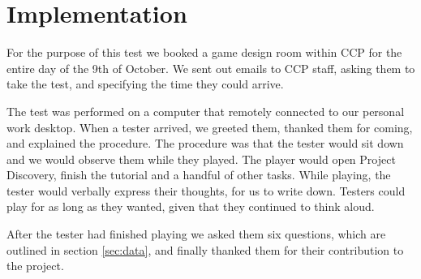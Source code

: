 \section{Implementation}\label{sec:implementation}
For the purpose of this test we booked a game design room within CCP for the entire day of the 9th of October. We sent out emails to CCP staff, asking them to take the test, and specifying the time they could arrive.

The test was performed on a computer that remotely connected to our personal work desktop. When a tester arrived, we greeted them, thanked them for coming, and explained the procedure. The procedure was that the tester would sit down and we would observe them while they played. The player would open Project Discovery, finish the tutorial and a handful of other tasks. While playing, the tester would verbally express their thoughts, for us to write down. Testers could play for as long as they wanted, given that they continued to think aloud.

After the tester had finished playing we asked them six questions, which are outlined in section \ref{sec:data}, and finally thanked them for their contribution to the project.